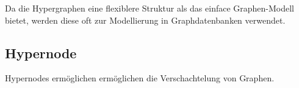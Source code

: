 Da die Hypergraphen eine flexiblere Struktur als das einface Graphen-Modell bietet, werden diese oft zur Modellierung in Graphdatenbanken verwendet.\cite{flockdb}
\subsection{Hypernode}
Hypernodes ermöglichen ermöglichen die Verschachtelung von Graphen.